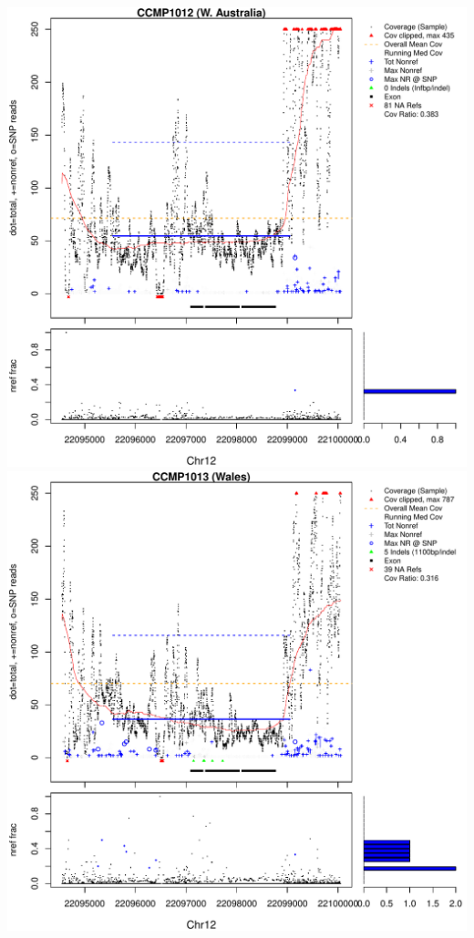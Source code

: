 \documentclass{article}\usepackage[]{graphicx}\usepackage[]{color}
\makeatletter
\def\maxwidth{ %
  \ifdim\Gin@nat@width>\linewidth
    \linewidth
  \else
    \Gin@nat@width
  \fi
}
\newenvironment{knitrout}{}{} %
\makeatother
\begin{document}
\begin{knitrout}
{\includegraphics[width=\maxwidth]{figs-knitr/unnamed-chunk-55-3} 
\includegraphics[width=\maxwidth]{figs-knitr/unnamed-chunk-55-4} 
}
\end{knitrout}
\end{document}
